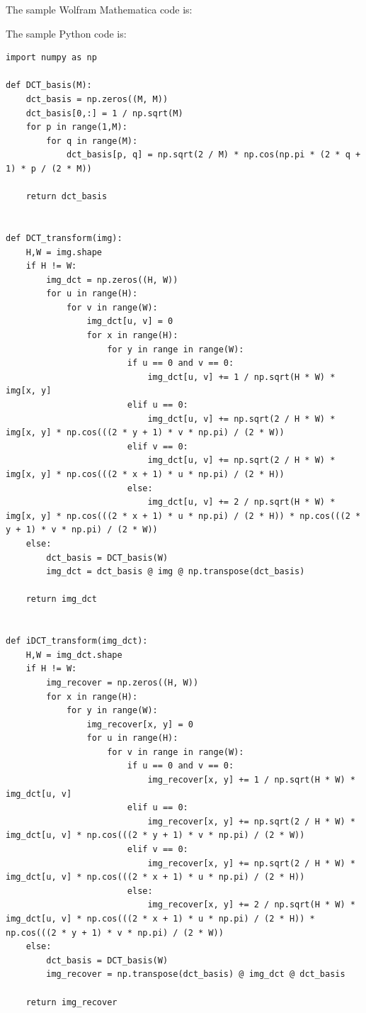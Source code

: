 \documentclass[a4paper,12pt,twoside]{article}
\begin{document}
The sample Wolfram Mathematica code is:


The sample Python code is:
\begin{verbatim}
import numpy as np

def DCT_basis(M):
    dct_basis = np.zeros((M, M))
    dct_basis[0,:] = 1 / np.sqrt(M)
    for p in range(1,M):
        for q in range(M):
            dct_basis[p, q] = np.sqrt(2 / M) * np.cos(np.pi * (2 * q + 1) * p / (2 * M))
    
    return dct_basis


def DCT_transform(img):
    H,W = img.shape
    if H != W:
        img_dct = np.zeros((H, W))
        for u in range(H):
            for v in range(W):
                img_dct[u, v] = 0
                for x in range(H):
                    for y in range in range(W):
                        if u == 0 and v == 0:
                            img_dct[u, v] += 1 / np.sqrt(H * W) * img[x, y]
                        elif u == 0:
                            img_dct[u, v] += np.sqrt(2 / H * W) * img[x, y] * np.cos(((2 * y + 1) * v * np.pi) / (2 * W))
                        elif v == 0:
                            img_dct[u, v] += np.sqrt(2 / H * W) * img[x, y] * np.cos(((2 * x + 1) * u * np.pi) / (2 * H))
                        else:
                            img_dct[u, v] += 2 / np.sqrt(H * W) * img[x, y] * np.cos(((2 * x + 1) * u * np.pi) / (2 * H)) * np.cos(((2 * y + 1) * v * np.pi) / (2 * W))
    else:
        dct_basis = DCT_basis(W)
        img_dct = dct_basis @ img @ np.transpose(dct_basis)
    
    return img_dct


def iDCT_transform(img_dct):
    H,W = img_dct.shape
    if H != W:
        img_recover = np.zeros((H, W))
        for x in range(H):
            for y in range(W):
                img_recover[x, y] = 0
                for u in range(H):
                    for v in range in range(W):
                        if u == 0 and v == 0:
                            img_recover[x, y] += 1 / np.sqrt(H * W) * img_dct[u, v]
                        elif u == 0:
                            img_recover[x, y] += np.sqrt(2 / H * W) * img_dct[u, v] * np.cos(((2 * y + 1) * v * np.pi) / (2 * W))
                        elif v == 0:
                            img_recover[x, y] += np.sqrt(2 / H * W) * img_dct[u, v] * np.cos(((2 * x + 1) * u * np.pi) / (2 * H))
                        else:
                            img_recover[x, y] += 2 / np.sqrt(H * W) * img_dct[u, v] * np.cos(((2 * x + 1) * u * np.pi) / (2 * H)) * np.cos(((2 * y + 1) * v * np.pi) / (2 * W))
    else:
        dct_basis = DCT_basis(W)
        img_recover = np.transpose(dct_basis) @ img_dct @ dct_basis
    
    return img_recover
\end{verbatim}
\end{document}
